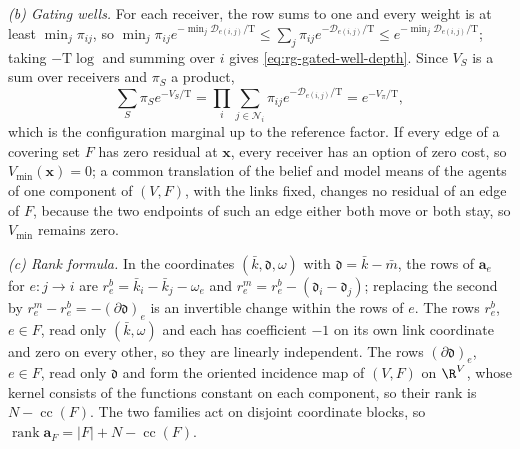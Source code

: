 \emph{(b) Gating wells.} For each receiver, the row sums to one and every
weight is at least \(\min_j\pi_{ij}\), so
\(\min_j\pi_{ij}e^{-\min_j\mathcal D_{e(i,j)}/\mathrm T}
\le\sum_j\pi_{ij}e^{-\mathcal D_{e(i,j)}/\mathrm T}
\le e^{-\min_j\mathcal D_{e(i,j)}/\mathrm T}\); taking \(-\mathrm T\log\) and
summing over \(i\) gives \cref{eq:rg-gated-well-depth}. Since \(V_S\) is a sum
over receivers and \(\pi_S\) a product,
\[
\sum_S\pi_Se^{-V_S/\mathrm T}=\prod_i\sum_{j\in\mathcal N_i}\pi_{ij}
e^{-\mathcal D_{e(i,j)}/\mathrm T}=e^{-V_\pi/\mathrm T},
\]
which is the configuration marginal up to the reference factor. If every edge of a
covering set \(F\) has zero residual at \(\mathbf x\), every receiver has an
option of zero cost, so \(V_{\min}(\mathbf x)=0\); a common translation of the
belief and model means of the agents of one component of \((V,F)\), with the
links fixed, changes no residual of an edge of \(F\), because the two
endpoints of such an edge either both move or both stay, so \(V_{\min}\)
remains zero.

\emph{(c) Rank formula.} In the coordinates \((\bar k,\mathfrak d,\omega)\)
with \(\mathfrak d=\bar k-\bar m\), the rows of \(\mathbf a_e\) for
\(e:j\to i\) are \(r^b_e=\bar k_i-\bar k_j-\omega_e\) and
\(r^m_e=r^b_e-(\mathfrak d_i-\mathfrak d_j)\); replacing the second by
\(r^m_e-r^b_e=-(\partial\mathfrak d)_e\) is an invertible change within the
rows of \(e\). The rows \(r^b_e\), \(e\in F\), read only \((\bar k,\omega)\)
and each has coefficient \(-1\) on its own link coordinate and zero on every
other, so they are linearly independent. The rows \((\partial\mathfrak d)_e\),
\(e\in F\), read only \(\mathfrak d\) and form the oriented incidence map of
\((V,F)\) on \(\R^V\), whose kernel consists of the functions constant on each
component, so their rank is \(N-\operatorname{cc}(F)\). The two families act
on disjoint coordinate blocks, so
\(\operatorname{rank}\mathbf a_F=|F|+N-\operatorname{cc}(F)\).

